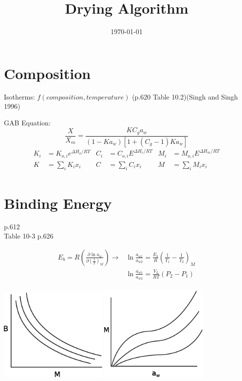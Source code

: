 \documentclass[11pt]{article}
\begin{document}
\title{Drying Algorithm}
\date{\today}
\maketitle

\section{Composition}
Isotherms: $f(composition, temperature)$ (p.620 Table 10.2)(Singh and Singh  1996)

GAB Equation:
\[ \frac{X}{X_m} = \frac{K C_g a_w}{(1-K a_w)\left[1 + (C_g-1)K a_w\right]} \]
\begin{align*}
K_i&=K_{o,i} e^{\Delta H_k/RT} & C_i&=C_{o,i} E^{\Delta H_c/RT} & M_i&=M_{o,i} E^{\Delta H_m/RT}\\
K&=\sum_i K_i x_i & C&=\sum_i C_i x_i & M&=\sum_i M_i x_i\\
\end{align*}

\section{Binding Energy}
p.612\\
Table 10-3 p.626

\begin{align*}
E_b = R\left(\frac{\partial\ln a_w}{\partial\left(\frac{1}{T}\right)_M}\right) \rightarrow &\ln\frac{a_{w1}}{a_{w2}} = \frac{E_b}{R}\left(\frac{1}{T_1}-\frac{1}{T_2}\right)_M \\
& \ln\frac{a_{w1}}{a_{w2}} = \frac{V_L}{RT}(P_2-P_1) \\
\end{align*}

\begin{center}
\includegraphics[width=0.4\textwidth]{pics/eps/binding_energy_1}
\includegraphics[width=0.4\textwidth]{pics/eps/binding_energy_2}
\end{center}
\end{document}
